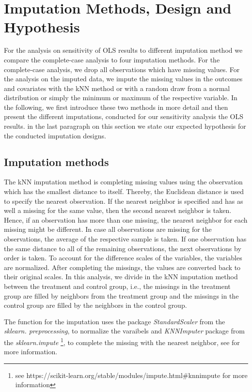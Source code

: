 \section{Imputation Methods, Design and Hypothesis}
\label{sec:imputation_method}

For the analysis on sensitivity of \ac{OLS} results to different imputation method we compare the complete-case analysis to four imputation methods. For the complete-case analysis, we drop all observations which have missing values. For the analysis on the imputed data, we impute the missing values in the outcomes and covariates with the \ac{kNN} method or with a random draw from a normal distribution or simply the minimum or maximum of the respective variable. In the following, we first introduce these two methods in more detail and then present the different imputations, conducted for our sensitivity analysis the \ac{OLS} results. in the last paragraph on this section we state our expected hypothesis for the conducted imputation designs.

\subsection{Imputation methods}
The \ac{kNN} imputation method is completing missing values using the observation which has the smallest distance to itself. Thereby, the Euclidean distance is used to specify the nearest observation. If the nearest neighbor is specified and has as well a missing for the same value, then the second nearest neighbor is taken. Hence, if an observation has more than one missing, the nearest neighbor for each missing might be different. In case all observations are missing for the observations, the average of the respective sample is taken. If one observation has the same distance to all of the remaining observations, the next observations by order is taken. To account for the difference scales of the variables, the variables are normalized. After completing the missings, the values are converted back to their original scales. In this analysis, we divide in the \ac{kNN} imputation method between the treatment and control group, i.e., the missings in the treatment group are filled by neighbors from the treatment group and the missings in the control group are filled by the neighbors in the control group.

The function for the imputation uses the package \textit{StandardScaler} from the \textit{sklearn.
preprocessing}, to normalize the varaibels and \textit{KNNImputer} package from the \textit{sklearn.impute} \footnote{see https://scikit-learn.org/stable/modules/impute.html#knnimpute for more information}, to complete the missing with the nearest neighbor, see \textcite{troyanskaya2001missing} for more information.

